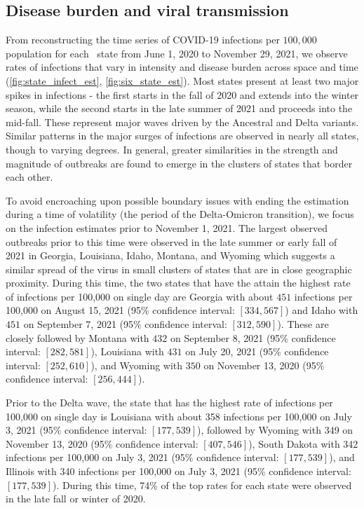 \documentclass{article}
\begin{document}
\subsection{Disease burden and viral transmission}

From reconstructing the time series of COVID-19 infections per $100,000$
population for each \US\ state from June 1, 2020 to November 29, 2021, we observe
rates of infections that vary in intensity and disease burden across space and
time (\autoref{fig:state_infect_est},
 \autoref{fig:six_state_est}).  
 Most states present at least two major spikes in infections - the first starts in the fall of 2020 and extends into the winter season, while 
 the second starts in the late summer of 2021 and proceeds into the mid-fall. These represent major waves driven by the Ancestral and Delta variants.
Similar patterns in the major surges of infections are observed in nearly all states, though to varying degrees. In general, greater similarities
in the strength and magnitude of outbreaks are found to emerge in the clusters of
states that border each other.

To avoid encroaching upon possible boundary issues with ending the estimation during a time of volatility (the period of the Delta-Omicron transition), 
we focus on the infection estimates prior to November 1, 2021.
The largest observed outbreaks prior to this time were observed in the late summer or early fall of 2021
in Georgia, Louisiana, Idaho, Montana, and Wyoming which suggests a similar spread of the virus in
small clusters of states that are in close geographic proximity. During this time, the two states that
have the attain the highest rate of infections per 100,000 on single day are Georgia with
about $451$ infections per 100,000 on August 15, 2021 (95\% confidence interval:
$[334, 567]$) and Idaho with $451$ on September 7, 2021 (95\%
confidence interval: $[312, 590]$). These are closely followed by Montana with $432$ on September 8, 2021
(95\% confidence interval: $[282, 581]$), Louisiana with $431$ on July 20, 2021
(95\% confidence interval: $[252, 610]$), and Wyoming with $350$ on November 13, 2020
(95\% confidence interval: $[256, 444]$).

Prior to the Delta wave, the state that has the
highest rate of infections per 100,000 on single day is Louisiana with about
358 infections per 100,000 on July 3, 2021 (95\% confidence interval:
$[177, 539]$), followed by Wyoming with 349 on November 13, 2020 (95\%
confidence interval: $[407, 546]$), South Dakota with 342 infections per 100,000 on July 3, 2021 (95\% confidence interval:
$[177, 539]$), and Illinois with 340 infections per 100,000 on July 3, 2021 (95\% confidence interval:
$[177, 539]$). During this time, 74\% of the top rates for each state were observed in the late fall or winter of 2020.
\end{document}
